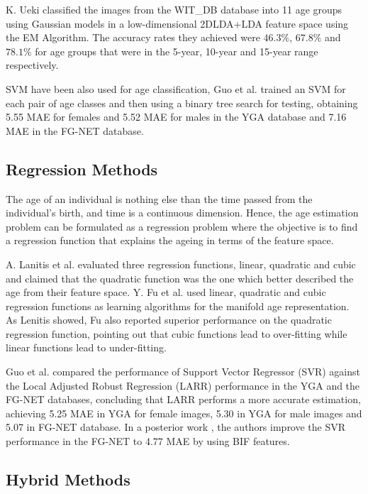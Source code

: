 K. Ueki \cite{Ueki:2006:SAC:1126250.1126269} classified the images from the WIT\_DB database into 11 age groups using Gaussian models in a low-dimensional 2DLDA+LDA feature space using the EM Algorithm. The accuracy rates they achieved were $46.3\%$, $67.8\%$ and $78.1\%$ for age groups that were in the 5-year, 10-year and 15-year range respectively.

SVM have been also used for age classification, Guo et al. \cite{4544009} \cite{Guo:2008:IHA:2319085.2321608} trained an SVM for each pair of age classes and then using a binary tree search for testing, obtaining 5.55 MAE for females and 5.52 MAE for males in the YGA database and 7.16 MAE in the FG-NET database. 


\subsection{Regression Methods}

The age of an individual is nothing else than the time passed from the individual's birth, and time is a continuous dimension. Hence, the age estimation problem can be formulated as a regression problem where the objective is to find a regression function that explains the ageing in terms of the feature space.

A. Lanitis et al. \cite{Lanitis:2004:CDC:2225304.2226166} evaluated three regression functions, linear, quadratic and cubic and claimed that the quadratic function was the one which better described the age from their feature space. Y. Fu et al. \cite{4523958} \cite{4284917} used linear, quadratic and cubic regression functions as learning algorithms for the manifold age representation. As Lenitis showed, Fu also reported superior performance on the quadratic regression function, pointing out that cubic functions lead to over-fitting while linear functions lead to under-fitting.

Guo et al. \cite{4544009} \cite{Guo:2008:IHA:2319085.2321608} compared the performance of Support Vector Regressor (SVR) against the Local Adjusted Robust Regression (LARR) performance in the YGA and the FG-NET databases, concluding that LARR performs a more accurate estimation, achieving 5.25 MAE in YGA for female images, 5.30 in YGA for male images and  5.07 in FG-NET database. In a posterior work \cite{conf/cvpr/GuoMFH09}, the authors improve the SVR performance in the FG-NET to 4.77 MAE by using BIF features.

\subsection{Hybrid Methods}

